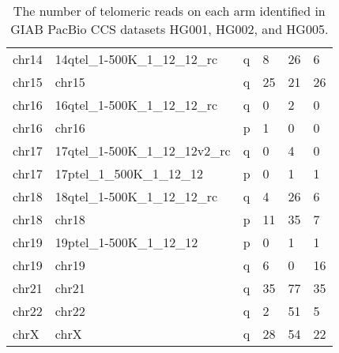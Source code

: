 \begin{samepage}
\begin{table}[h!]
\begin{tabular}{llllll}
chr14                &  14qtel\_1-500K\_1\_12\_12\_rc    &  q             &  8               &  26              &  6              \\
chr15                &  chr15                            &  q             &  25              &  21              &  26             \\
chr16                &  16qtel\_1-500K\_1\_12\_12\_rc    &  q             &  0               &  2               &  0              \\
chr16                &  chr16                            &  p             &  1               &  0               &  0              \\
chr17                &  17qtel\_1-500K\_1\_12\_12v2\_rc  &  q             &  0               &  4               &  0              \\
chr17                &  17ptel\_1\_500K\_1\_12\_12       &  p             &  0               &  1               &  1              \\
chr18                &  18qtel\_1-500K\_1\_12\_12\_rc    &  q             &  4               &  26              &  6              \\
chr18                &  chr18                            &  p             &  11              &  35              &  7              \\
chr19                &  19ptel\_1-500K\_1\_12\_12        &  p             &  0               &  1               &  1              \\
chr19                &  chr19                            &  q             &  6               &  0               &  16             \\
chr21                &  chr21                            &  q             &  35              &  77              &  35             \\
chr22                &  chr22                            &  q             &  2               &  51              &  5              \\
chrX                 &  chrX                             &  q             &  28              &  54              &  22             \\
\hline
\end{tabular}
\caption{The number of telomeric reads on each arm identified in GIAB PacBio CCS datasets HG001, HG002, and HG005.}
\label{tab:telomeric_read_counts}
\end{table}
\end{samepage}
